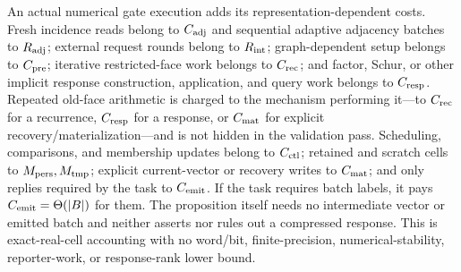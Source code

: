 \begin{remark}
An actual numerical gate execution adds its representation-dependent costs.
Fresh incidence reads belong to $C_{\rm adj}$ and sequential adaptive
adjacency batches to $R_{\rm adj}$; external request rounds belong to
$R_{\rm int}$; graph-dependent setup belongs to $C_{\rm pre}$; iterative
restricted-face work belongs to $C_{\rm rec}$; and factor, Schur, or other
implicit response construction, application, and query work belongs to
$C_{\rm resp}$.  Repeated old-face arithmetic is charged to the mechanism
performing it---to $C_{\rm rec}$ for a recurrence, $C_{\rm resp}$ for a
response, or $C_{\rm mat}$ for explicit recovery/materialization---and is not
hidden in the validation pass.  Scheduling, comparisons, and membership
updates belong to $C_{\rm ctl}$; retained and scratch cells to
$M_{\rm pers},M_{\rm tmp}$;
explicit current-vector or recovery writes to $C_{\rm mat}$; and only replies
required by the task to $C_{\rm emit}$.  If the task requires batch labels,
it pays $C_{\rm emit}=\Theta(|B|)$ for them.  The proposition itself needs no
intermediate vector or emitted batch and neither asserts nor rules out a
compressed response.  This is exact-real-cell accounting with no word/bit,
finite-precision, numerical-stability, reporter-work, or response-rank lower
bound.
\end{remark}

